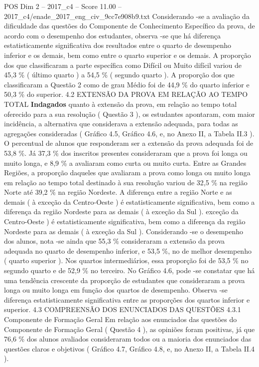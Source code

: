 \begin{textsample}{POS Dim 2 – 2017\_c4 – Score 11.00 – 2017\_c4/enade\_2017\_eng\_civ\_9cc7e908b9.txt}
Considerando -se a avaliação da dificuldade das questões do Componente de Conhecimento Específico da prova, de acordo com o desempenho dos estudantes, observa -se que há diferença estatisticamente significativa dos resultados entre o quarto de desempenho inferior e os demais, bem como entre o quarto superior e os demais.
A proporção dos que classificaram a parte específica como Difícil ou Muito difícil variou de 45,3 \% ( último quarto ) a 54,5 \% ( segundo quarto ).
A proporção dos que classificaram a Questão 2 como de grau Médio foi de 44,9 \% do quarto inferior e 50,3 \% do superior. 4.2 EXTENSÃO DA PROVA EM RELAÇÃO AO TEMPO TOTAL \textbf{Indagados} quanto à extensão da prova, em relação ao tempo total oferecido para a sua resolução ( Questão 3 ), os estudantes apontaram, com maior incidência, a alternativa que considerava a extensão adequada, para todas as agregações consideradas ( Gráfico 4.5, Gráfico 4.6, e, no Anexo II, a Tabela II.3 ).
O percentual de alunos que responderam ser a extensão da prova adequada foi de 53,8 \%.
Já 37,3 \% dos inscritos presentes consideraram que a prova foi longa ou muito longa, e 8,9 \% a avaliaram como curta ou muito curta.
Entre as Grandes Regiões, a proporção daqueles que avaliaram a prova como longa ou muito longa em relação ao tempo total destinado à sua resolução variou de 32,5 \% na região Norte até 39,2 \% na região Nordeste.
A diferença entre a região Norte e as demais ( à exceção da Centro-Oeste ) é estatisticamente significativa, bem como a diferença da região Nordeste para as demais ( à exceção da Sul ). exceção da Centro-Oeste ) é estatisticamente significativa, bem como a diferença da região Nordeste para as demais ( à exceção da Sul ).
Considerando -se o desempenho dos alunos, nota -se ainda que 55,3 \% consideraram a extensão da prova adequada no quarto de desempenho inferior, e 53,5 \%, no de melhor desempenho ( quarto superior ).
Nos quartos intermediários, essa proporção foi de 53,5 \% no segundo quarto e de 52,9 \% no terceiro.
No Gráfico 4.6, pode -se constatar que há uma tendência crescente da proporção de estudantes que consideraram a prova longa ou muito longa em função dos quartos de desempenho.
Observa -se diferença estatisticamente significativa entre as proporções dos quartos inferior e superior. 4.3 COMPREENSÃO DOS ENUNCIADOS DAS QUESTÕES 4.3.1 Componente de Formação Geral Em relação aos enunciados das questões do Componente de Formação Geral ( Questão 4 ), as opiniões foram positivas, já que 76,6 \% dos alunos avaliados consideraram todos ou a maioria dos enunciados das questões claros e objetivos ( Gráfico 4.7, Gráfico 4.8, e, no Anexo II, a Tabela II.4 ).

\end{textsample}
